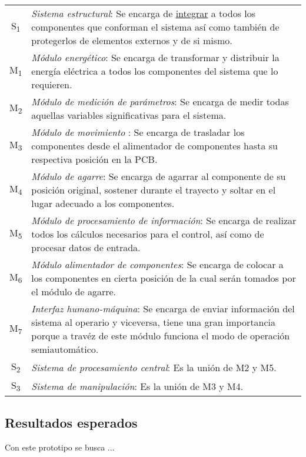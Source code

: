 \begin{tabular}{c p{150mm}}
	S\textsubscript{1} & \textit{Sistema estructural}: Se encarga de \underline{integrar} a todos los componentes que conforman el sistema así como también de protegerlos de elementos externos y de si mismo.\\
	M\textsubscript{1} & \textit{Módulo energético}: Se encarga de transformar y distribuir la energía eléctrica a todos los componentes del sistema que lo requieren. \\
	M\textsubscript{2} & \textit{Módulo de medición de parámetros}: Se encarga de medir todas aquellas variables significativas para el sistema.\\
	M\textsubscript{3} & \textit{Módulo de movimiento }: Se encarga de trasladar los componentes desde el alimentador de componentes hasta su respectiva posición en la PCB.\\
	M\textsubscript{4} & \textit{Módulo de agarre}: Se encarga de agarrar al componente de su posición original, sostener durante el trayecto y soltar en el lugar adecuado a los componentes. \\
	M\textsubscript{5} & \textit{Módulo de procesamiento de información}: Se encarga de realizar todos los cálculos necesarios para el control, así como de procesar datos de entrada. \\
	M\textsubscript{6} & \textit{Módulo alimentador de componentes}: Se encarga de colocar a los componentes en cierta posición de la cual serán tomados por el módulo de agarre. \\
	M\textsubscript{7} & \textit{Interfaz humano-máquina}: Se encarga de enviar información del sistema al operario  y viceversa, tiene una gran importancia porque a travéz de este módulo funciona el modo de operación semiautomático. \\
	S\textsubscript{2} & \textit{Sistema de procesamiento central}: Es la unión de M2 y M5. \\
	S\textsubscript{3} & \textit{Sistema de manipulación}: Es la unión de M3 y M4.
\end{tabular}

\subsection{Resultados esperados}
Con este prototipo se busca ...

